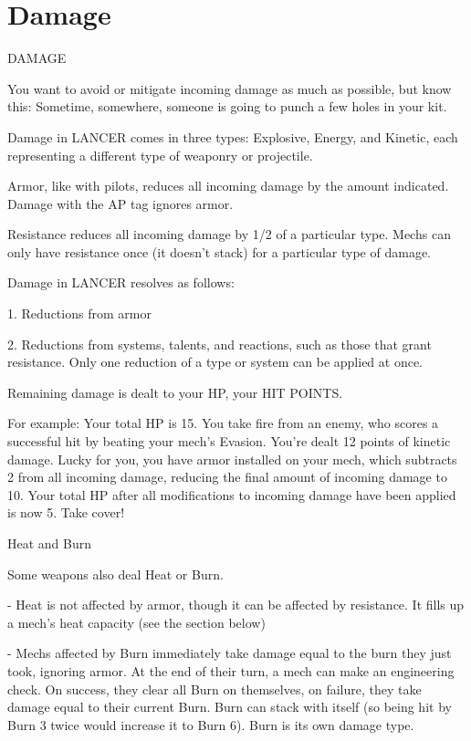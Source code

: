 \section{Damage}
 DAMAGE

You want to avoid or mitigate incoming damage as much as possible, but know this: Sometime,
somewhere, someone is going to punch a few holes in your kit.


Damage in LANCER comes in three types: Explosive, Energy, and Kinetic, each representing a
different type of weaponry or projectile.


Armor, like with pilots, reduces all incoming damage by the amount indicated. Damage with the
AP tag ignores armor.

Resistance reduces all incoming damage by 1/2 of a particular type. Mechs can only have
resistance once (it doesn’t stack) for a particular type of damage.


Damage in LANCER resolves as follows:

             1.  Reductions from armor

             2.  Reductions from systems, talents, and reactions, such as those that grant
                 resistance. Only one reduction of a type or system can be applied at once.

Remaining damage is dealt to your HP, your HIT POINTS.


For example: Your total HP is  15. You take fire from an enemy, who scores a successful hit by
beating your mech’s Evasion. You’re dealt 12 points of kinetic damage. Lucky for you, you have
armor installed on your mech, which subtracts 2 from all incoming damage, reducing the final
amount of incoming damage to  10. Your total HP after all modifications to incoming damage
have been applied is now 5. Take cover!

                                               Heat and Burn

Some weapons also deal Heat or Burn.

    -    Heat is not affected by armor, though it can be affected by resistance. It fills up a mech’s
         heat capacity (see the section below)

    -    Mechs affected by Burn immediately take damage equal to the burn they just took,
         ignoring armor. At the end of their turn, a mech can make an engineering check. On
        success, they clear all Burn on themselves, on failure, they take damage equal to their
        current Burn. Burn can stack with itself (so being hit by Burn 3 twice would increase it to
         Burn 6). Burn is its own damage type.

